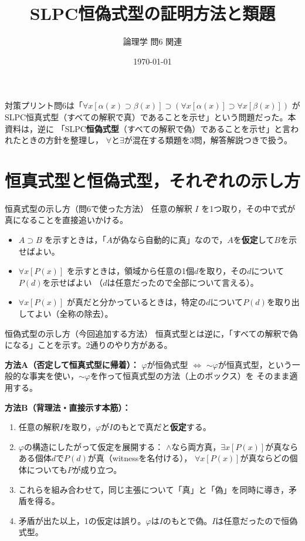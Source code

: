 \documentclass[autodetect-engine,dvi=dvipdfmx,ja=standard]{bxjsarticle}
\title{SLPC恒偽式型の証明方法と類題}
\author{論理学 問6 関連}
\date{\today}
\begin{document}
\maketitle

対策プリント問6は「\(\forall x[\alpha(x)\supset\beta(x)]\supset(\forall x[\alpha(x)]\supset\forall x[\beta(x)])\)
がSLPC恒真式型（すべての解釈で真）であることを示せ」という問題だった。本資料は，逆に
「SLPC\textbf{恒偽式型}（すべての解釈で偽）であることを示せ」と言われたときの方針を整理し，
\(\forall\)と\(\exists\)が混在する類題を3問，解答解説つきで扱う。

\section{恒真式型と恒偽式型，それぞれの示し方}

\begin{sidebox}[TBteal]{恒真式型の示し方（問6で使った方法）}
任意の解釈 \(I\) を1つ取り，その中で式が真になることを直接追いかける。
\begin{itemize}
  \item \(A\supset B\) を示すときは，「\(A\)が偽なら自動的に真」なので，\(A\)を\textbf{仮定}して\(B\)を示せばよい。
  \item \(\forall x[P(x)]\) を示すときは，領域から任意の1個\(d\)を取り，その\(d\)について\(P(d)\)を示せばよい
    （\(d\)は任意だったので全部について言える）。
  \item \(\forall x[P(x)]\) が真だと分かっているときは，特定の\(d\)について\(P(d)\)を取り出してよい（全称の除去）。
\end{itemize}
\end{sidebox}

\begin{sidebox}[TBred]{恒偽式型の示し方（今回追加する方法）}
恒真式型とは逆に，「すべての解釈で偽になる」ことを示す。2通りのやり方がある。

\textbf{方法A（否定して恒真式型に帰着）：} \(\varphi\)が恒偽式型 \(\Longleftrightarrow\)
\(\sim\varphi\)が恒真式型，という一般的な事実を使い，\(\sim\varphi\)を作って恒真式型の方法（上のボックス）を
そのまま適用する。

\textbf{方法B（背理法・直接示す本筋）：}
\begin{enumerate}
  \item 任意の解釈\(I\)を取り，\(\varphi\)が\(I\)のもとで真だと\textbf{仮定}する。
  \item \(\varphi\)の構造にしたがって仮定を展開する：
    \(\land\)なら両方真，\(\exists x[P(x)]\)が真ならある個体\(d\)で\(P(d)\)が真（witnessを名付ける），
    \(\forall x[P(x)]\)が真ならどの個体についても\(P\)が成り立つ。
  \item これらを組み合わせて，同じ主張について「真」と「偽」を同時に導き，矛盾を得る。
  \item 矛盾が出た以上，1の仮定は誤り。\(\varphi\)は\(I\)のもとで偽。\(I\)は任意だったので恒偽式型。
\end{enumerate}
\end{sidebox}
\end{document}
